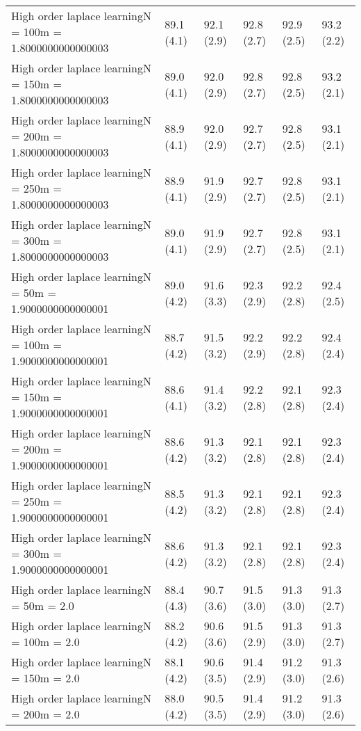 \documentclass{article}
\begin{document}
\begin{table*}[t!]
\begin{center}
\begin{small}
\begin{sc}
\begin{tabular}{llllll}
High order laplace learningN = 100m = 1.8000000000000003&89.1 (4.1)      &92.1 (2.9)      &92.8 (2.7)      &92.9 (2.5)      &93.2 (2.2)      \\
High order laplace learningN = 150m = 1.8000000000000003&89.0 (4.1)      &92.0 (2.9)      &92.8 (2.7)      &92.8 (2.5)      &93.2 (2.1)      \\
High order laplace learningN = 200m = 1.8000000000000003&88.9 (4.1)      &92.0 (2.9)      &92.7 (2.7)      &92.8 (2.5)      &93.1 (2.1)      \\
High order laplace learningN = 250m = 1.8000000000000003&88.9 (4.1)      &91.9 (2.9)      &92.7 (2.7)      &92.8 (2.5)      &93.1 (2.1)      \\
High order laplace learningN = 300m = 1.8000000000000003&89.0 (4.1)      &91.9 (2.9)      &92.7 (2.7)      &92.8 (2.5)      &93.1 (2.1)      \\
High order laplace learningN = 50m = 1.9000000000000001&89.0 (4.2)      &91.6 (3.3)      &92.3 (2.9)      &92.2 (2.8)      &92.4 (2.5)      \\
High order laplace learningN = 100m = 1.9000000000000001&88.7 (4.2)      &91.5 (3.2)      &92.2 (2.9)      &92.2 (2.8)      &92.4 (2.4)      \\
High order laplace learningN = 150m = 1.9000000000000001&88.6 (4.1)      &91.4 (3.2)      &92.2 (2.8)      &92.1 (2.8)      &92.3 (2.4)      \\
High order laplace learningN = 200m = 1.9000000000000001&88.6 (4.2)      &91.3 (3.2)      &92.1 (2.8)      &92.1 (2.8)      &92.3 (2.4)      \\
High order laplace learningN = 250m = 1.9000000000000001&88.5 (4.2)      &91.3 (3.2)      &92.1 (2.8)      &92.1 (2.8)      &92.3 (2.4)      \\
High order laplace learningN = 300m = 1.9000000000000001&88.6 (4.2)      &91.3 (3.2)      &92.1 (2.8)      &92.1 (2.8)      &92.3 (2.4)      \\
High order laplace learningN = 50m = 2.0&88.4 (4.3)      &90.7 (3.6)      &91.5 (3.0)      &91.3 (3.0)      &91.3 (2.7)      \\
High order laplace learningN = 100m = 2.0&88.2 (4.2)      &90.6 (3.6)      &91.5 (2.9)      &91.3 (3.0)      &91.3 (2.7)      \\
High order laplace learningN = 150m = 2.0&88.1 (4.2)      &90.6 (3.5)      &91.4 (2.9)      &91.2 (3.0)      &91.3 (2.6)      \\
High order laplace learningN = 200m = 2.0&88.0 (4.2)      &90.5 (3.5)      &91.4 (2.9)      &91.2 (3.0)      &91.3 (2.6)      \\

\end{tabular}
\end{sc}
\end{small}
\end{center}
\end{table*}
\end{document}
